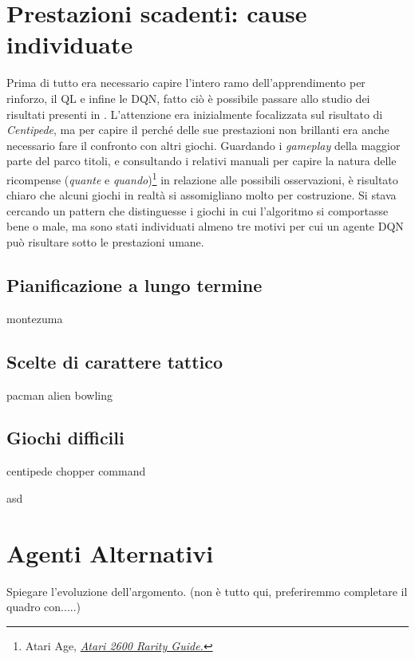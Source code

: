 \documentclass[twoside,twocolumn,10pt]{extarticle}
\theoremstyle{definition}
\begin{document}
\section{Prestazioni scadenti: cause individuate}
	Prima di tutto era necessario capire l'intero ramo dell'apprendimento per rinforzo, il QL e infine le DQN, fatto ciò è possibile passare allo studio dei risultati presenti in \cite{bib:dqn}. L'attenzione era inizialmente focalizzata sul risultato di \textit{Centipede}, ma per capire il perché delle sue prestazioni non brillanti era anche necessario fare il confronto con altri giochi. Guardando i \textit{gameplay} della maggior parte del parco titoli, e consultando i relativi manuali per capire la natura delle ricompense (\textit{quante} e \textit{quando})\footnote{Atari Age, \emph{\href{https://atariage.com/software_search.php?SystemID=2600}{Atari 2600 Rarity Guide.}}} in relazione alle possibili osservazioni, è risultato chiaro che alcuni giochi in realtà si assomigliano molto per costruzione. Si stava cercando un pattern che distinguesse i giochi in cui l'algoritmo si comportasse bene o male, ma sono stati individuati almeno tre motivi per cui un agente DQN può risultare sotto le prestazioni umane.

	\subsection{Pianificazione a lungo termine}
		montezuma

	\subsection{Scelte di carattere tattico}
		pacman
		alien
		bowling
	
	\subsection{Giochi difficili}
		centipede
		chopper command
	
	
	
	\begin{table}[h]
		\centering
		\caption{asd}
		
		\label{tab:gerarchia}
	\end{table}		
		
\section{Agenti Alternativi}\label{}
	Spiegare l'evoluzione dell'argomento. (non è tutto qui, preferiremmo completare il quadro con.....)
	
\end{document}

